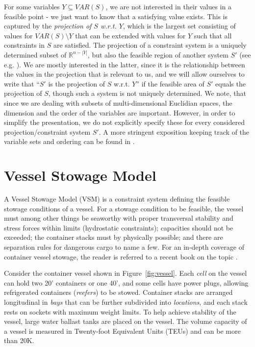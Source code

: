 \documentclass{llncs}
\newcommand{\VAR}{\mathit{VAR}}
\begin{document}
For some variables $Y\subseteq \VAR(S)$, we are not interested in their values in a feasible point - we just want to know that a satisfying value exists. This is captured by the \emph{projection of $S$ w.r.t. $Y$}, which is the largest set consisting of values for $\VAR(S)\setminus Y$ that can be extended with values for $Y$ such that all constraints in $S$ are satisfied. 
%
The projection of a constraint system is a uniquely determined subset of $\mathbb{R}^{n-|Y|}$, but also the feasible region of another system $S'$ (see e.g. \cite{ziegler95}). We are mostly interested in the latter, since it is the relationship between the values in the projection that is relevant to us, and we will allow ourselves to write that ``$S'$ is the projection of $S$ w.r.t. $Y$'' if the feasible area of $S'$ equals the projection of $S$, though such a system is not uniquely determined.
We note, that since we are dealing with subsets of multi-dimensional Euclidian spaces, the dimension and the order of the variables are important. However, in order to simplify the presentation, we do not explicitly specify these for every considered projection/constraint system $S'$. A more stringent exposition keeping track of the variable sets and ordering can be found in \cite{mytechrep}.
\section{Vessel Stowage Model}\label{sec:model}
A Vessel Stowage Model (VSM) is a constraint system defining the feasible stowage conditions of a vessel. For a stowage condition to be feasible, the vessel must among other things be seaworthy with proper transversal stability and stress forces within limits (hydrostatic constraints); 
capacities should not be exceeded; the container stacks must by physically possible;  
and there are separation rules for dangerous cargo to name a few. For an in-depth coverage of container vessel stowage, the reader is referred to a recent book on the topic \cite{JPAV18}.     

Consider the container vessel shown in Figure~\ref{fig:vessel}. Each \emph{cell} on the vessel can hold two 20' containers or one 40', and some cells have power plugs, allowing refrigerated containers (\emph{reefers}) to be stowed. Container stacks are arranged longitudinal in \emph{bays} that can be further subdivided into \emph{locations}, and each stack rests on sockets with maximum weight limits. To help achieve stability of the vessel, large water ballast tanks are placed on the vessel.
The volume capacity of a vessel is measured in Twenty-foot Equivalent Units (TEUs) and can be more than 20K. 
\end{document}
